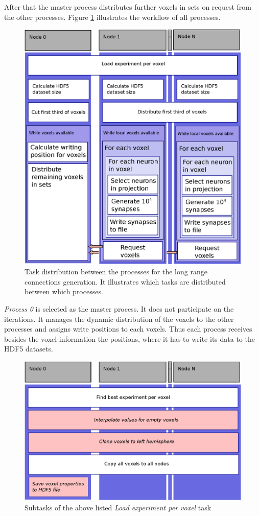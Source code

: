 After that the master process distributes further voxels in sets on request from the other processes.
Figure \ref{fig:longrangParallel} illustrates the workflow of all processes.
\begin{figure}[ht!]
\centering
\includegraphics[scale=0.5]{pictures/longRange_parallelAlg.eps}
\caption{Task distribution between the processes for the long range connections generation. It illustrates which tasks are distributed between which processes.}
\label{fig:longrangParallel}
\end{figure}
\emph{Process 0} is selected as the master process. It does not participate on the iterations.
It manages the dynamic distribution of the voxels to the other processes and 
assigns write positions to each voxels. Thus each process receives besides the 
voxel information the positions,
where it has to write its data to the HDF5 datasets.
\begin{figure}[ht!]
\centering
\includegraphics[scale=0.5]{pictures/longRange_BestExp_parallelAlg.eps}
\caption{Subtasks of the above listed \emph{Load experiment per voxel} task}
\label{fig:longrangeLEPV}
\end{figure}

